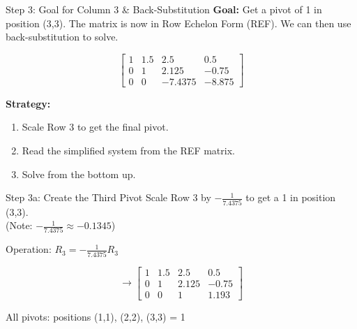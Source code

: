 \documentclass[aspectratio=169,xcolor=dvipsnames,svgnames,x11names,fleqn]{beamer}
\begin{document}
\begin{frame}{Step 3: Goal for Column 3 \& Back-Substitution}
\centering
\textbf{Goal:} Get a pivot of \alert{1} in position (3,3). The matrix is now in Row Echelon Form (REF). We can then use \alert{back-substitution} to solve.

$$
\left[\begin{array}{ccc|c}
1 & 1.5 & 2.5 & 0.5\\
0 & 1 & 2.125 & -0.75\\
0 & 0 & -7.4375 & -8.875
\end{array}\right]
$$

\vspace{5mm}
\textbf{Strategy:}
\begin{enumerate}
    \item Scale Row 3 to get the final pivot.
    \item Read the simplified system from the REF matrix.
    \item Solve from the bottom up.
\end{enumerate}
\end{frame}

\begin{frame}{Step 3a: Create the Third Pivot}
\centering
Scale Row 3 by $-\frac{1}{7.4375}$ to get a \alert{1} in position (3,3).\\ (Note: $-\frac{1}{7.4375} \approx -0.1345$)

\vspace{3mm}
\alert{Operation:} $R_3 = -\frac{1}{7.4375} R_3$

\vspace{3mm}
$$
\rightarrow \left[\begin{array}{ccc|c}
1 & 1.5 & 2.5 & 0.5\\
0 & 1 & 2.125 & -0.75\\
0 & 0 & 1 & 1.193
\end{array}\right]
$$

\vspace{3mm}
\colorbox{red!20}{All pivots: positions (1,1), (2,2), (3,3) = 1}
\end{frame}
\end{document}
